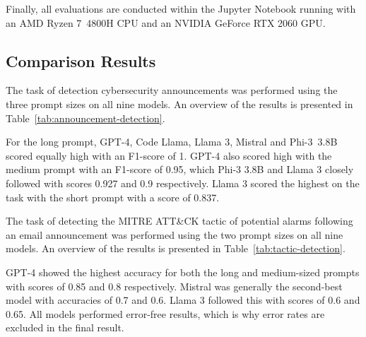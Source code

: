 Finally, all evaluations are conducted within the Jupyter Notebook running with an AMD Ryzen 7\ 4800H CPU and an NVIDIA
GeForce RTX 2060 GPU\@.

\subsection{Comparison Results}
\label{subsec:rq3-comparison-results}

The task of detection cybersecurity announcements was performed using the three prompt sizes on all nine models.
An overview of the results is presented in Table\ \ref{tab:announcement-detection}.



For the long prompt, GPT-4, Code Llama, Llama 3, Mistral and Phi-3\ 3.8B scored equally high with an F1-score of 1.
GPT-4 also scored high with the medium prompt with an F1-score of 0.95, which Phi-3 3.8B and Llama 3 closely followed
with scores 0.927 and 0.9 respectively.
Llama 3 scored the highest on the task with the short prompt with a score of 0.837.

The task of detecting the MITRE ATT\&CK tactic of potential alarms following an email announcement was performed using
the two prompt sizes on all nine models.
An overview of the results is presented in Table\ \ref{tab:tactic-detection}.



GPT-4 showed the highest accuracy for both the long and medium-sized prompts with scores of 0.85 and 0.8 respectively.
Mistral was generally the second-best model with accuracies of 0.7 and 0.6.
Llama 3 followed this with scores of 0.6 and 0.65.
All models performed error-free results, which is why error rates are excluded in the final result.